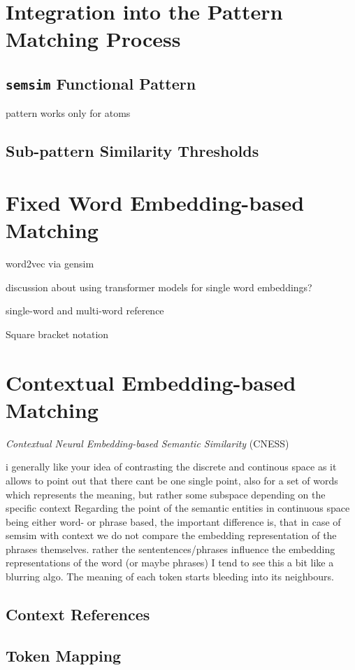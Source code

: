 \documentclass[11pt]{scrreprt}
\begin{document}
\section{Integration into the Pattern Matching Process}
\subsection{\texttt{semsim} Functional Pattern}
pattern works only for atoms

\subsection{Sub-pattern Similarity Thresholds}


\section{Fixed Word Embedding-based Matching}
word2vec via gensim

discussion about using transformer models for single word embeddings?

single-word and multi-word reference

\label{sec:semsim-multi-word}
Square bracket notation 

\section{Contextual Embedding-based Matching}
\textit{Contextual Neural Embedding-based Semantic Similarity} (CNESS)


i generally like your idea of contrasting the discrete and continous space as it allows to point out that there cant be one single point, also for a set of words which represents the meaning, but rather some subspace depending on the specific context
Regarding the point of the semantic entities in continuous space being either word- or phrase based, the important difference is, that in case of semsim with context we do not compare the embedding representation of the phrases themselves. rather the sententences/phrases influence the embedding representations of the word (or maybe phrases)
 I tend to see this a bit like a blurring algo. The meaning of each token starts bleeding into its neighbours.


\subsection{Context References}
\subsection{Token Mapping}
\end{document}
